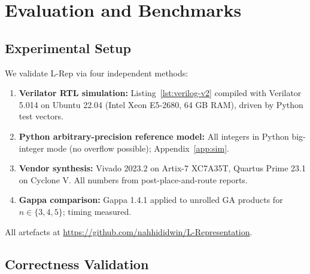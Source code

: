\documentclass[11pt,a4paper]{article}
\theoremstyle{definition}
\theoremstyle{plain}
\theoremstyle{remark}
\begin{document}
\section{Evaluation and Benchmarks}
\label{sec:eval}

\subsection{Experimental Setup}

We validate L-Rep via four independent methods:
\begin{enumerate}
  \item \textbf{Verilator RTL simulation:} Listing~\ref{lst:verilog-v2}
        compiled with Verilator 5.014 on Ubuntu 22.04 (Intel Xeon E5-2680,
        64 GB RAM), driven by Python test vectors.
  \item \textbf{Python arbitrary-precision reference model:}
        All integers in Python big-integer mode (no overflow possible);
        Appendix~\ref{app:sim}.
  \item \textbf{Vendor synthesis:} Vivado 2023.2 on Artix-7 XC7A35T,
        Quartus Prime 23.1 on Cyclone V.
        All numbers from post-place-and-route reports.
  \item \textbf{Gappa comparison:} Gappa 1.4.1 applied to unrolled GA
        products for $n\in\{3,4,5\}$; timing measured.
\end{enumerate}

All artefacts at \url{https://github.com/nahhididwin/L-Representation}.

\subsection{Correctness Validation}
\end{document}
